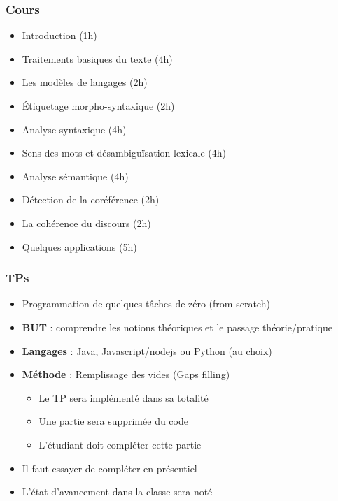 \documentclass{beamer}
\begin{document}
\begin{frame}
\frametitle{Cours}

\begin{itemize}
	\item Introduction (1h)
	\item Traitements basiques du texte (4h)
	\item Les modèles de langages (2h)
	\item Étiquetage morpho-syntaxique (2h)
	\item Analyse syntaxique (4h)
	\item Sens des mots et désambiguïsation lexicale (4h)
	\item Analyse sémantique (4h)
	\item Détection de la coréférence (2h)
	\item {\color{red} La cohérence du discours (2h)}
	\item {\color{red} Quelques applications (5h)}
\end{itemize}

\end{frame}

\begin{frame}
	\frametitle{TPs}
	
	\begin{itemize}
		\item Programmation de quelques tâches de zéro (from scratch)
		\item \textbf{BUT} : comprendre les notions théoriques et le passage théorie/pratique
		\item \textbf{Langages} : Java, Javascript/nodejs ou Python (au choix)
		\item \textbf{Méthode} : Remplissage des vides (Gaps filling)
		\begin{itemize}
			\item Le TP sera implémenté dans sa totalité
			\item Une partie sera supprimée du code
			\item L'étudiant doit compléter cette partie
		\end{itemize}
		\item Il faut essayer de compléter en présentiel
		\item L'état d'avancement dans la classe sera noté
	\end{itemize}
	
\end{frame}
\end{document}
